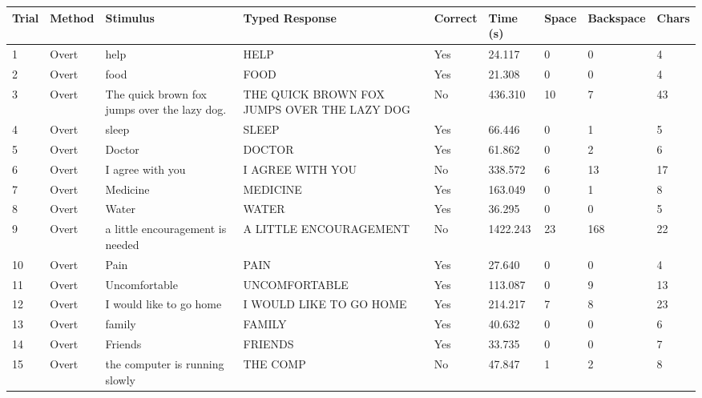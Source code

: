 \documentclass[10pt,a4paper]{article}
\begin{document}
\begin{center}
\begin{tabularx}{\textwidth}{
    C{0.45in}
    C{0.65in}
    L{2.35in}
    L{2.55in}
    C{0.65in}
    C{0.65in}
    C{0.55in}
    C{0.75in}
    C{0.55in}
}
\toprule

\textbf{Trial} &
\textbf{Method} &
\textbf{Stimulus} &
\textbf{Typed Response} &
\textbf{Correct} &
\textbf{Time (s)} &
\textbf{Space} &
\textbf{Backspace} &
\textbf{Chars}
\\

\midrule

1 &
Overt &
help &
HELP &
Yes &
24.117 &
0 &
0 &
4
\\

2 &
Overt &
food &
FOOD &
Yes &
21.308 &
0 &
0 &
4
\\

3 &
Overt &
The quick brown fox jumps over the lazy dog. &
THE QUICK BROWN FOX JUMPS OVER THE LAZY DOG &
No &
436.310 &
10 &
7 &
43
\\

4 &
Overt &
sleep &
SLEEP &
Yes &
66.446 &
0 &
1 &
5
\\

5 &
Overt &
Doctor &
DOCTOR &
Yes &
61.862 &
0 &
2 &
6
\\

6 &
Overt &
I agree with you &
I AGREE WITH  YOU &
No &
338.572 &
6 &
13 &
17
\\

7 &
Overt &
Medicine &
MEDICINE &
Yes &
163.049 &
0 &
1 &
8
\\

8 &
Overt &
Water &
WATER &
Yes &
36.295 &
0 &
0 &
5
\\

9 &
Overt &
a little encouragement is needed &
A LITTLE ENCOURAGEMENT &
No &
1422.243 &
23 &
168 &
22
\\

10 &
Overt &
Pain &
PAIN &
Yes &
27.640 &
0 &
0 &
4
\\

11 &
Overt &
Uncomfortable &
UNCOMFORTABLE &
Yes &
113.087 &
0 &
9 &
13
\\

12 &
Overt &
I would like to go home &
I WOULD LIKE TO GO HOME &
Yes &
214.217 &
7 &
8 &
23
\\

13 &
Overt &
family &
FAMILY &
Yes &
40.632 &
0 &
0 &
6
\\

14 &
Overt &
Friends &
FRIENDS &
Yes &
33.735 &
0 &
0 &
7
\\

15 &
Overt &
the computer is running slowly &
THE COMP &
No &
47.847 &
1 &
2 &
8
\\

\bottomrule
\end{tabularx}
\end{center}
\end{document}
